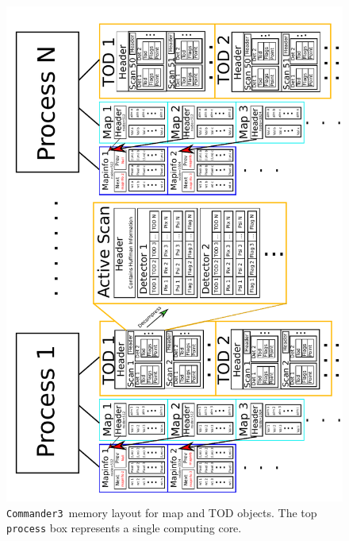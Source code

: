 \documentclass[twocolumn]{aa}
\def\commanderthree{\texttt{Commander3}}
\begin{document}
\begin{figure}[t]
  \center
  \includegraphics[angle=270,width=\linewidth]{figs/memory_map.pdf}
  \caption{\commanderthree\ memory layout for map and TOD objects. The
    top \texttt{process} box represents a single computing core. 
  }\label{fig:memory}
\end{figure}
\end{document}
